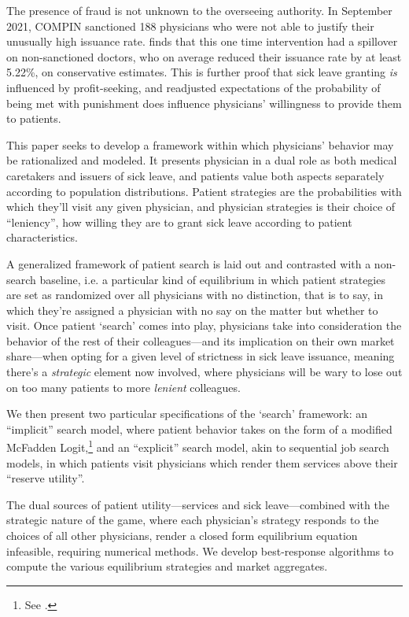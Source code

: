 \documentclass[../main.tex]{subfiles}
\begin{document}
The presence of fraud is not unknown to the overseeing authority. In September 2021, COMPIN sanctioned 188 physicians who were not able to justify their unusually high issuance rate. \cite{oteiza} finds that this one time intervention had a spillover on non-sanctioned doctors, who on average reduced their issuance rate by at least 5.22\%, on conservative estimates. This is further proof that sick leave granting \textit{is} influenced by profit-seeking, and readjusted expectations of the probability of being met with punishment does influence physicians' willingness to provide them to patients.

This paper seeks to develop a framework within which physicians' behavior may be rationalized and modeled. It presents physician in a dual role as both medical caretakers and issuers of sick leave, and patients value both aspects separately according to population distributions. Patient strategies are the probabilities with which they'll visit any given physician, and physician strategies is their choice of ``leniency'', how willing they are to grant sick leave according to patient characteristics.

A generalized framework of patient search is laid out and contrasted with a non-search baseline, i.e. a particular kind of equilibrium in which patient strategies are set as randomized over all physicians with no distinction, that is to say, in which they're assigned a physician with no say on the matter but whether to visit. Once patient `search' comes into play, physicians take into consideration the behavior of the rest of their colleagues—and its implication on their own market share—when opting for a given level of strictness in sick leave issuance, meaning there's a \textit{strategic} element now involved, where physicians will be wary to lose out on too many patients to more \textit{lenient} colleagues.

We then present two particular specifications of the `search' framework: an ``implicit'' search model, where patient behavior takes on the form of a modified McFadden Logit,\footnote{See \cite{mcfadden}.} and an ``explicit'' search model, akin to sequential job search models, in which patients visit physicians which render them services above their ``reserve utility''.

The dual sources of patient utility—services and sick leave—combined with the strategic nature of the game, where each physician's strategy responds to the choices of all other physicians, render a closed form equilibrium equation infeasible, requiring numerical methods. We develop best-response algorithms to compute the various equilibrium strategies and market aggregates.
\end{document}
